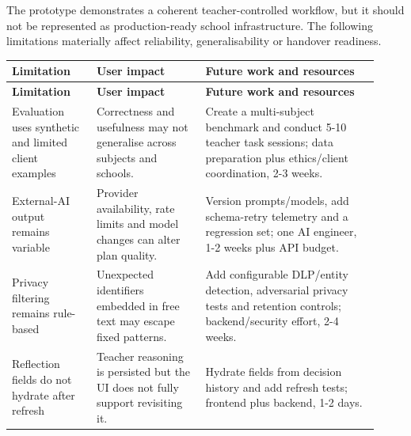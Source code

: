 \documentclass[11pt,a4paper]{article}
\begin{document}
The prototype demonstrates a coherent teacher-controlled workflow, but it should not be represented as production-ready school infrastructure. The following limitations materially affect reliability, generalisability or handover readiness.\par

\begin{small}

\setlength{\tabcolsep}{3pt}

\begin{longtable}{>{\raggedright\arraybackslash}p{0.216\linewidth}>{\raggedright\arraybackslash}p{0.270\linewidth}>{\raggedright\arraybackslash}p{0.433\linewidth}}

\hline

\textbf{Limitation} & \textbf{User impact} & \textbf{Future work and resources} \\ \hline

\endfirsthead

\hline

\textbf{Limitation} & \textbf{User impact} & \textbf{Future work and resources} \\ \hline

\endhead

Evaluation uses synthetic and limited client examples & Correctness and usefulness may not generalise across subjects and schools. & Create a multi-subject benchmark and conduct 5-10 teacher task sessions; data preparation plus ethics/\allowbreak{}client coordination, 2-3 weeks. \\ \hline

External-AI output remains variable & Provider availability, rate limits and model changes can alter plan quality. & Version prompts/\allowbreak{}models, add schema-retry telemetry and a regression set; one AI engineer, 1-2 weeks plus API budget. \\ \hline

Privacy filtering remains rule-based & Unexpected identifiers embedded in free text may escape fixed patterns. & Add configurable DLP/\allowbreak{}entity detection, adversarial privacy tests and retention controls; backend/\allowbreak{}security effort, 2-4 weeks. \\ \hline

Reflection fields do not hydrate after refresh & Teacher reasoning is persisted but the UI does not fully support revisiting it. & Hydrate fields from decision history and add refresh tests; frontend plus backend, 1-2 days. \\ \hline


\end{longtable}
\end{small}
\end{document}
